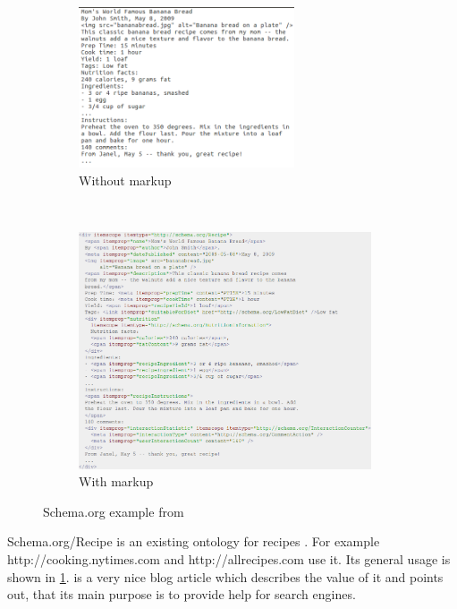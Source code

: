 \documentclass[12pt, twoside]{report}
\begin{document}
\begin{figure}
	\begin{subfigure}{1\textwidth}
		\centering
		\includegraphics[width=0.7\textwidth]{Images/schemaRecipeWithoutMarkup}
		\caption{Without markup }
	\end{subfigure} \\
	\begin{subfigure}{1\textwidth}
		\centering
		\includegraphics[width=0.95\textwidth]{Images/schemaRecipeWithMarkup}
		\caption{With markup }
	\end{subfigure}
	\caption{Schema.org example from \parencite{schemaRecipe}}
	\label{fig:schemaOrgRecipe}
\end{figure}

Schema.org/Recipe is an existing ontology for recipes \parencite{schemaRecipe}. For example http://cooking.nytimes.com and http://allrecipes.com use it. Its general usage is shown in \cref{fig:schemaOrgRecipe}. \parencite{foodBlogger} is a very nice blog article which describes the value of it and points out, that its main purpose is to provide help for search engines.
\end{document}
